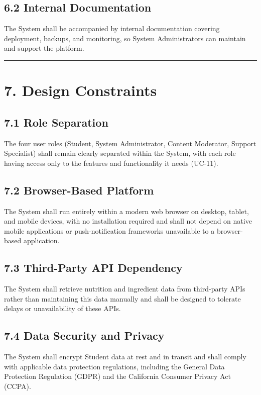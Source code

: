 \documentclass[10pt,letterpaper]{article}
\newcommand{\ucseparator}{\vspace{1em}\noindent\rule{\linewidth}{0.4pt}\vspace{1.5em}}
\begin{document}
\subsection*{6.2 Internal Documentation}
The System shall be accompanied by internal documentation covering deployment, backups, and monitoring, so System Administrators can maintain and support the platform.

\ucseparator

\section*{7. Design Constraints}

\subsection*{7.1 Role Separation}
The four user roles (Student, System Administrator, Content Moderator, Support Specialist) shall remain clearly separated within the System, with each role having access only to the features and functionality it needs (UC-11).

\subsection*{7.2 Browser-Based Platform}
The System shall run entirely within a modern web browser on desktop, tablet, and mobile devices, with no installation required and shall not depend on native mobile applications or push-notification frameworks unavailable to a browser-based application.

\subsection*{7.3 Third-Party API Dependency}
The System shall retrieve nutrition and ingredient data from third-party APIs rather than maintaining this data manually and shall be designed to tolerate delays or unavailability of these APIs.

\subsection*{7.4 Data Security and Privacy}
The System shall encrypt Student data at rest and in transit and shall comply with applicable data protection regulations, including the General Data Protection Regulation (GDPR) and the California Consumer Privacy Act (CCPA).
\end{document}
